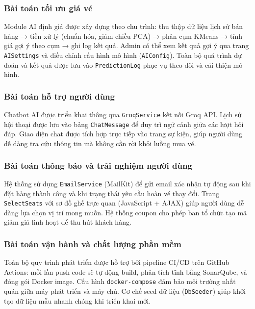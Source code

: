 \documentclass[../main.tex]{subfiles}
\begin{document}
\subsubsection{Bài toán tối ưu giá vé}

Module AI định giá được xây dựng theo chu trình: thu thập dữ liệu lịch sử bán hàng → tiền xử lý (chuẩn hóa, giảm chiều PCA) → phân cụm KMeans → tính giá gợi ý theo cụm → ghi log kết quả. Admin có thể xem kết quả gợi ý qua trang \texttt{AISettings} và điều chỉnh cấu hình mô hình (\texttt{AIConfig}). Toàn bộ quá trình dự đoán và kết quả được lưu vào \texttt{PredictionLog} phục vụ theo dõi và cải thiện mô hình.

\subsubsection{Bài toán hỗ trợ người dùng}

Chatbot AI được triển khai thông qua \texttt{GroqService} kết nối Groq API. Lịch sử hội thoại được lưu vào bảng \texttt{ChatMessage} để duy trì ngữ cảnh giữa các lượt hỏi đáp. Giao diện chat được tích hợp trực tiếp vào trang sự kiện, giúp người dùng dễ dàng tra cứu thông tin mà không cần rời khỏi luồng mua vé.

\subsubsection{Bài toán thông báo và trải nghiệm người dùng}

Hệ thống sử dụng \texttt{EmailService} (MailKit) để gửi email xác nhận tự động sau khi đặt hàng thành công và khi trạng thái yêu cầu hoàn vé thay đổi. Trang \texttt{SelectSeats} với sơ đồ ghế trực quan (JavaScript + AJAX) giúp người dùng dễ dàng lựa chọn vị trí mong muốn. Hệ thống coupon cho phép ban tổ chức tạo mã giảm giá linh hoạt để thu hút khách hàng.

\subsubsection{Bài toán vận hành và chất lượng phần mềm}

Toàn bộ quy trình phát triển được hỗ trợ bởi pipeline CI/CD trên GitHub Actions: mỗi lần push code sẽ tự động build, phân tích tĩnh bằng SonarQube, và đóng gói Docker image. Cấu hình \texttt{docker-compose} đảm bảo môi trường nhất quán giữa máy phát triển và máy chủ. Cơ chế seed dữ liệu (\texttt{DbSeeder}) giúp khởi tạo dữ liệu mẫu nhanh chóng khi triển khai mới.
\end{document}
